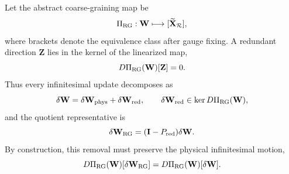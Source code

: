 Let the abstract coarse-graining map be
\begin{equation}
  \Pi_{\rm RG}:\mathbf W\longmapsto[\widetilde{\mathbf X}_{\mathcal R}],
\end{equation}
where brackets denote the equivalence class after gauge fixing. A redundant direction $\mathbf Z$ lies in the kernel of the linearized map,
\begin{equation}
  D\Pi_{\rm RG}(\mathbf W)[\mathbf Z]=0.
\end{equation}
Thus every infinitesimal update decomposes as
\begin{equation}
  \delta\mathbf W=\delta\mathbf W_{\rm phys}+\delta\mathbf W_{\rm red},
  \qquad \delta\mathbf W_{\rm red}\in\ker D\Pi_{\rm RG}(\mathbf W),
\end{equation}
and the quotient representative is
\begin{equation}
  \delta\mathbf W_{\rm RG}=(\mathbf I-P_{\mathrm{red}})\delta\mathbf W.
\end{equation}
By construction, this removal must preserve the physical infinitesimal motion,
\begin{equation}
  D\Pi_{\rm RG}(\mathbf W)[\delta\mathbf W_{\rm RG}]
  =D\Pi_{\rm RG}(\mathbf W)[\delta\mathbf W].
\end{equation}

